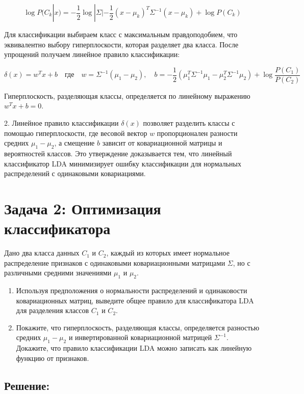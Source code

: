    \[
   \log P(C_k | x) = -\frac{1}{2} \log |\Sigma| - \frac{1}{2} (x - \mu_k)^T \Sigma^{-1} (x - \mu_k) + \log P(C_k)
   \]

   Для классификации выбираем класс с максимальным правдоподобием, что эквивалентно выбору гиперплоскости, которая разделяет два класса. После упрощений получаем линейное правило классификации:

   \[
   \delta(x) = w^T x + b \quad \text{где} \quad w = \Sigma^{-1} (\mu_1 - \mu_2), \quad b = -\frac{1}{2} (\mu_1^T \Sigma^{-1} \mu_1 - \mu_2^T \Sigma^{-1} \mu_2) + \log \frac{P(C_1)}{P(C_2)}
   \]

   Гиперплоскость, разделяющая классы, определяется по линейному выражению \( w^T x + b = 0 \).

2. Линейное правило классификации \( \delta(x) \) позволяет разделить классы с помощью гиперплоскости, где весовой вектор \( w \) пропорционален разности средних \( \mu_1 - \mu_2 \), а смещение \( b \) зависит от ковариационной матрицы и вероятностей классов. Это утверждение доказывается тем, что линейный классификатор LDA минимизирует ошибку классификации для нормальных распределений с одинаковыми ковариациями.

\section*{Задача 2: Оптимизация классификатора}

Дано два класса данных \( C_1 \) и \( C_2 \), каждый из которых имеет нормальное распределение признаков с одинаковыми ковариационными матрицами \( \Sigma \), но с различными средними значениями \( \mu_1 \) и \( \mu_2 \).

\begin{enumerate}
    \item Используя предположения о нормальности распределений и одинаковости ковариационных матриц, выведите общее правило для классификатора LDA для разделения классов \( C_1 \) и \( C_2 \).
    \item Покажите, что гиперплоскость, разделяющая классы, определяется разностью средних \( \mu_1 - \mu_2 \) и инвертированной ковариационной матрицей \( \Sigma^{-1} \). Докажите, что правило классификации LDA можно записать как линейную функцию от признаков.
\end{enumerate}

\subsection*{Решение:}

